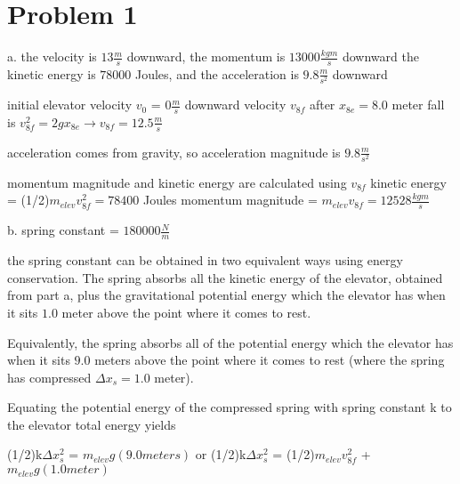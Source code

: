 \chapter{Problem 1}
\label{Problem 1}
a. the velocity is $13 \frac{m}{s}$ downward, the momentum is $13000 \frac{kg m}{s}$ downward
   the kinetic energy is $78000$ Joules, and the acceleration is $9.8 \frac{m}{s^{2}}$ downward
                           
initial elevator velocity $v_{0}$ = $0 \frac{m}{s}$
downward velocity $v_{8f}$ after $x_{8e} = 8.0$ meter fall is
$v_{8f}^{2} = 2gx_{8e} \rightarrow v_{8f} = 12.5 \frac{m}{s}$
                                      
acceleration comes from gravity, so acceleration magnitude is $9.8 \frac{m}{s^{2}}$
                                     
momentum magnitude and kinetic energy are calculated using $v_{8f}$
kinetic energy = (1/2)$m_{elev}v_{8f}^{2} = 78400$ Joules
momentum magnitude = $m_{elev}v_{8f} = 12528 \frac{kg m}{s}$
                                                      
b. spring constant = $180000 \frac{N}{m}$
                                                      
the spring constant can be obtained in two equivalent ways using energy conservation.
The spring absorbs all the kinetic energy of the elevator, obtained from part a, plus
the gravitational potential energy which the elevator has when it sits $1.0$ meter
above the point where it comes to rest.
                                            
Equivalently, the spring absorbs all of the potential energy which the elevator has
when it sits $9.0$ meters above the point where it comes to rest (where the spring
has compressed $\Delta x_{s} = 1.0$ meter).
                                                                  
Equating the potential energy of the compressed spring with spring constant k to the 
elevator total energy yields

(1/2)k$\Delta x_{s}^{2}$ = $m_{elev}g(9.0 meters)$                
or                                                   
(1/2)k$\Delta x_{s}^{2}$ = (1/2)$m_{elev}v_{8f}^{2}$ + $m_{elev}g(1.0 meter)$
                                                    
